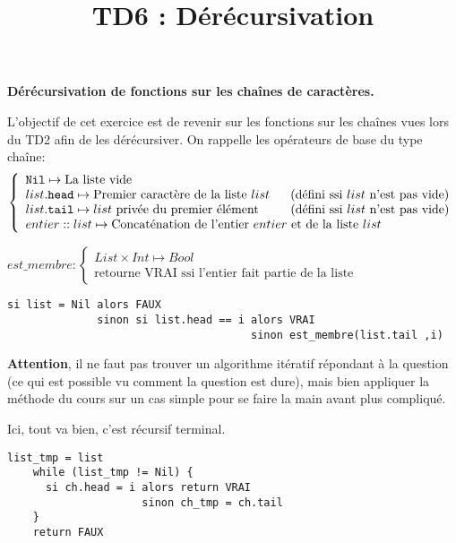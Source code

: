 \documentclass[10pt]{article}\usepackage[correction]{esial}
\begin{document}
\color{black}
\title{TD6 : Dérécursivation}
\maketitle



\Exercice \textbf{Dérécursivation de fonctions sur les chaînes de caractères.}

L'objectif de cet exercice est de revenir sur les fonctions sur les chaînes
vues lors du TD2 afin de les dérécursiver. On rappelle les opérateurs de
base du type chaîne:
$$\left\{
\begin{array}{l}
  \mathtt{Nil}  \mapsto \text{La liste vide}\\
  list\mathtt{.head} \mapsto \text{Premier caractère de la liste } list
    \;\;\;\;\;\;\text{(défini ssi } list \text{ n'est pas vide)}\\
  list\mathtt{.tail} \mapsto list \text{ privée du premier élément}
    \text{\hspace{9mm}(défini ssi } list \text{ n'est pas vide)}\\
  entier \;\mathtt{::}\; list \mapsto \text{Concaténation de l'entier } entier 
    \text{ et de la liste } list
\end{array}\right.
$$

\begin{Question}
  $est\_membre: \left\{
    \begin{array}{l}
      List\times Int \mapsto Bool\\
      \text{retourne VRAI ssi l'entier fait partie de la liste}
    \end{array}\right.$  
\end{Question}
\begin{Reponse}
  \begin{Verbatim}[label=est\_membre(ch\quotesinglbase c)]
si list = Nil alors FAUX
              sinon si list.head == i alors VRAI
                                      sinon est_membre(list.tail ,i)    
  \end{Verbatim}
  \textbf{Attention}, il ne faut pas trouver un algorithme itératif répondant à
  la question (ce qui est possible vu comment la question est dure), mais bien
  appliquer la méthode du cours sur un cas simple pour se faire la main avant
  plus compliqué.

  Ici, tout va bien, c'est récursif terminal.

  \begin{Verbatim}[label=est\_membre(ch\quotesinglbase c)]
    list_tmp = list
    while (list_tmp != Nil) {
      si ch.head = i alors return VRAI
                     sinon ch_tmp = ch.tail
    }
    return FAUX
  \end{Verbatim}
\end{Reponse}
\end{document}
